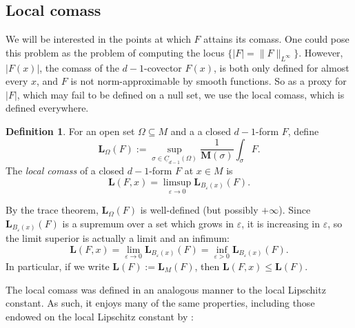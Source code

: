 \documentclass[reqno,11pt]{amsart}
\newcommand{\Chain}{\underline C}
\newcommand{\Mass}{\mathbf M}
\newcommand{\Comass}{\mathbf L}
\newcommand{\dfn}[1]{\emph{#1}\index{#1}}
\theoremstyle{definition}
\newtheorem{definition}[theorem]{Definition}
\numberwithin{equation}{section}
\begin{document}
\subsection{Local comass}
We will be interested in the points at which $F$ attains its comass.
One could pose this problem as the problem of computing the locus $\{|F| = \|F\|_{L^\infty}\}$.
However, $|F(x)|$, the comass of the $d - 1$-covector $F(x)$, is both only defined for almost every $x$, and $F$ is not norm-approximable by smooth functions.
So as a proxy for $|F|$, which may fail to be defined on a null set, we use the local comass, which is defined everywhere.

\begin{definition}
For an open set $\Omega \subseteq M$ and a a closed $d - 1$-form $F$, define 
$$\Comass_\Omega(F) := \sup_{\sigma \in \Chain_{d - 1}(\Omega)} \frac{1}{\Mass(\sigma)} \int_\sigma F.$$
The \dfn{local comass} of a closed $d - 1$-form $F$ at $x \in M$ is 
$$\Comass(F, x) = \limsup_{\varepsilon \to 0} \Comass_{B_\varepsilon(x)}(F).$$
\end{definition}

By the trace theorem, $\Comass_\Omega(F)$ is well-defined (but possibly $+\infty$).
Since $\Comass_{B_\varepsilon(x)}(F)$ is a supremum over a set which grows in $\varepsilon$, it is increasing in $\varepsilon$, so the limit superior is actually a limit and an infimum:
$$\Comass(F, x) = \lim_{\varepsilon \to 0} \Comass_{B_\varepsilon(x)}(F) = \inf_{\varepsilon > 0} \Comass_{B_\varepsilon(x)}(F).$$
In particular, if we write $\Comass(F) := \Comass_M(F)$, then $\Comass(F, x) \leq \Comass(F)$.

The local comass was defined in an analogous manner to the local Lipschitz constant.
As such, it enjoys many of the same properties, including those endowed on the local Lipschitz constant by \cite[Lemma 4.3]{Crandall2008}:
\end{document}
